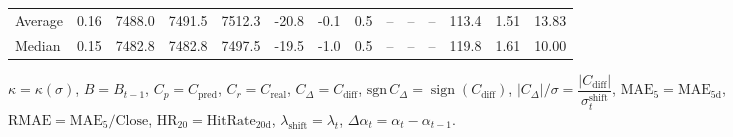 \begin{threeparttable}
{\begin{tabular}{lrrrrrrrrrrrrr}
Average &     0.16 & 7488.0 & 7491.5 & 7512.3 &      -20.8 &                     -0.1 &                 0.5 &         -- &        -- &             -- &            113.4 &            1.51 &                  13.83 \\
 Median &     0.15 & 7482.8 & 7482.8 & 7497.5 &      -19.5 &                     -1.0 &                 0.5 &         -- &        -- &             -- &            119.8 &            1.61 &                  10.00 \\
\bottomrule
\end{tabular}
}
\begin{tablenotes}\footnotesize
\item $\kappa=\kappa(\sigma)$, $B=B_{t-1}$, $C_p=C_{\text{pred}}$, $C_r=C_{\text{real}}$, $C_\Delta=C_{\text{diff}}$, $\mathrm{sgn}\,C_\Delta=\operatorname{sign}(C_{\text{diff}})$, $|C_\Delta|/\sigma=\dfrac{|C_{\text{diff}}|}{\sigma_t^{\text{shift}}}$, $\mathrm{MAE}_5=\mathrm{MAE}_{5\text{d}}$, $\mathrm{RMAE}= \mathrm{MAE}_5 / \text{Close}$, $\mathrm{HR}_{20}=\mathrm{HitRate}_{20\text{d}}$, 
$\lambda_{\text{shift}}=\lambda_t$, 
$\Delta\alpha_t=\alpha_t-\alpha_{t-1}$.
\end{tablenotes}
\end{threeparttable}
\endgroup

